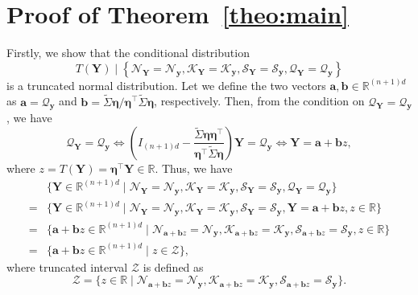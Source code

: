 \section{Proof of Theorem~\ref{theo:main}}
\label{app:proof_theo_main}
%
Firstly, we show that the conditional distribution
%
\begin{equation}
    T(\bm{Y}) \mid
    \left\{
    \mathcal{N}_{\bm{Y}} = \mathcal{N}_{\bm{y}},
    \mathcal{K}_{\bm{Y}} = \mathcal{K}_{\bm{y}},
    \mathcal{S}_{\bm{Y}} = \mathcal{S}_{\bm{y}},
    \mathcal{Q}_{\bm{Y}} = \mathcal{Q}_{\bm{y}}
    \right\}
\end{equation}
%
is a truncated normal distribution.
%
Let we define the two vectors $\bm{a},\bm{b}\in\mathbb{R}^{(n+1)d}$ as $\bm{a}=\mathcal{Q}_{\bm{y}}$ and $\bm{b}=\tilde{\Sigma}\bm{\eta}/\bm{\eta}^\top\tilde{\Sigma}\bm{\eta}$, respectively.
%
Then, from the condition on $\mathcal{Q}_{\bm{Y}}=\mathcal{Q}_{\bm{y}}$, we have
%
\begin{equation}
    \mathcal{Q}_{\bm{Y}} = \mathcal{Q}_{\bm{y}} \Leftrightarrow
    \left(
    I_{(n+1)d} -
    \frac{\tilde{\Sigma}\bm{\eta}\bm{\eta}^\top}{\bm{\eta}^\top\tilde{\Sigma}\bm{\eta}}
    \right)
    \bm{Y} =
    \mathcal{Q}_{\bm{y}}
    \Leftrightarrow
    \bm{Y} = \bm{a} + \bm{b}z,
\end{equation}
%
where $z=T(\bm{Y})=\bm{\eta}^\top\bm{Y}\in\mathbb{R}$. Thus, we have
%
\begin{align}
      &
    \{
    \bm{Y}\in\mathbb{R}^{(n+1)d}\mid
    \mathcal{N}_{\bm{Y}} = \mathcal{N}_{\bm{y}},
    \mathcal{K}_{\bm{Y}} = \mathcal{K}_{\bm{y}},
    \mathcal{S}_{\bm{Y}} = \mathcal{S}_{\bm{y}},
    \mathcal{Q}_{\bm{Y}} = \mathcal{Q}_{\bm{y}}
    \}  \\
    = &
    \{
    \bm{Y}\in\mathbb{R}^{(n+1)d}\mid
    \mathcal{N}_{\bm{Y}} = \mathcal{N}_{\bm{y}},
    \mathcal{K}_{\bm{Y}} = \mathcal{K}_{\bm{y}},
    \mathcal{S}_{\bm{Y}} = \mathcal{S}_{\bm{y}},
    \bm{Y} = \bm{a} + \bm{b}z, z\in\mathbb{R}
    \}  \\
    = &
    \{
    \bm{a} + \bm{b}z\in\mathbb{R}^{(n+1)d}\mid
    \mathcal{N}_{\bm{a}+\bm{b}z} = \mathcal{N}_{\bm{y}},
    \mathcal{K}_{\bm{a}+\bm{b}z} = \mathcal{K}_{\bm{y}},
    \mathcal{S}_{\bm{a}+\bm{b}z} = \mathcal{S}_{\bm{y}},
    z\in\mathbb{R}
    \}  \\
    = &
    \{
    \bm{a} + \bm{b}z\in\mathbb{R}^{(n+1)d}\mid
    z\in \mathcal{Z}
    \},
\end{align}
%
where truncated interval $\mathcal{Z}$ is defined as
%
\begin{equation}
    \mathcal{Z} =
    \{
    z\in\mathbb{R}\mid
    \mathcal{N}_{\bm{a}+\bm{b}z} = \mathcal{N}_{\bm{y}},
    \mathcal{K}_{\bm{a}+\bm{b}z} = \mathcal{K}_{\bm{y}},
    \mathcal{S}_{\bm{a}+\bm{b}z} = \mathcal{S}_{\bm{y}}
    \}.
\end{equation}
